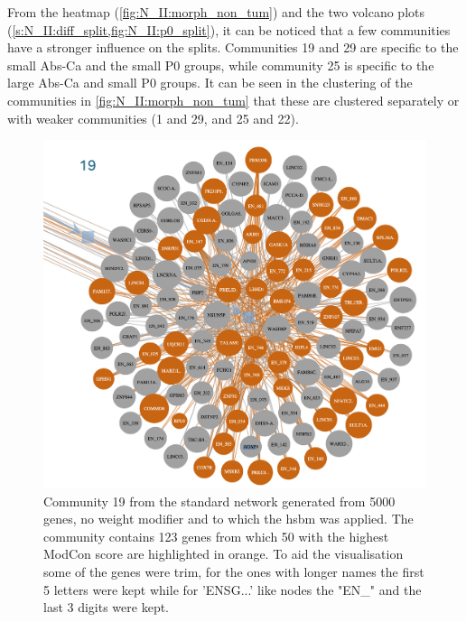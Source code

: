 From the heatmap (\cref{fig:N_II:morph_non_tum}) and the two volcano plots (\cref{s:N_II:diff_split,fig:N_II:p0_split}), it can be noticed that a few communities have a stronger influence on the splits. Communities 19 and 29 are specific to the small Abs-Ca and the small P0 groups, while community 25 is specific to the large Abs-Ca and small P0 groups. It can be seen in the clustering of the communities in \cref{fig:N_II:morph_non_tum} that these are clustered separately or with weaker communities (1 and 29, and 25 and 22).



\begin{figure}[H]    
    \centering
    \includegraphics[width=1.0\textwidth,height=1.0\textheight,keepaspectratio]{Sections/Network_II/resources/non_tum/19_com.png}
    \caption{Community 19 from the standard network generated from 5000 genes, no weight modifier and to which the \acrshort{hsbm} was applied. The community contains 123 genes from which 50 with the highest ModCon score are highlighted in orange. To aid the visualisation some of the genes were trim, for the ones with longer names the first 5 letters were kept while for 'ENSG...' like nodes the "EN\_" and the last 3 digits were kept. }
    \label{fig:N_II:19_com}
\end{figure}


